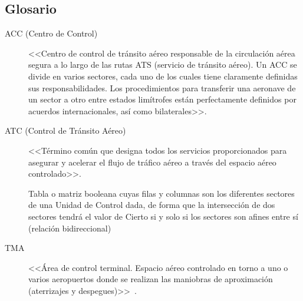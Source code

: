 \subsection{Glosario}
\label{sec:Definiciones}
\begin{description}
    \item[ACC (Centro de Control)] \label{ACC}
    <<Centro de control de tránsito aéreo responsable de la circulación aérea segura a lo largo de las rutas ATS (servicio de tránsito aéreo). Un ACC se divide en varios sectores, cada uno de los cuales tiene claramente definidas sus responsabilidades. Los procedimientos para transferir una aeronave de un sector a otro entre estados limítrofes están perfectamente definidos por acuerdos internacionales, así como bilaterales>>.~\cite{ENAIRE-web}

    \item [ATC (Control de Tránsito Aéreo)] \label{ATC} <<Término común que designa todos los servicios proporcionados para asegurar y acelerar el flujo de tráfico aéreo a través del espacio aéreo controlado>>.~\cite{ENAIRE-web}
    
    \item[] Tabla o matriz booleana cuyas filas y columnas son los diferentes sectores de una Unidad de Control dada, de forma que la intersección de dos sectores tendrá el valor de Cierto si y solo si los sectores son afines entre sí (relación bidireccional)
    
    \item[TMA] \label{TMA} <<Área de control terminal. Espacio aéreo controlado en torno a uno o varios aeropuertos donde se realizan las maniobras de aproximación (aterrizajes y despegues)>>~\cite{ENAIRE-web}.
\end{description}